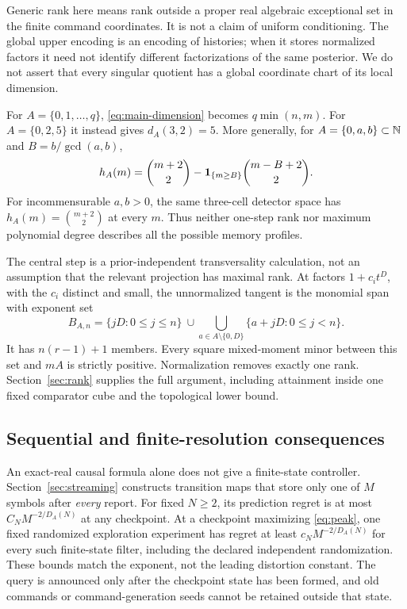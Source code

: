 Generic rank here means rank outside a proper real algebraic exceptional
set in the finite command coordinates. It is not a claim of uniform
conditioning. The global upper encoding is an encoding of histories;
when it stores normalized factors it need not identify different
factorizations of the same posterior. We do not assert that every singular
quotient has a global coordinate chart of its local dimension.

For $A=\{0,1,\ldots,q\}$, \eqref{eq:main-dimension} becomes
$q\min(n,m)$. For $A=\{0,2,5\}$ it instead gives $d_A(3,2)=5$.
More generally, for $A=\{0,a,b\}\subset\mathbb N$ and
$B=b/\gcd(a,b)$,
\begin{equation}\label{eq:three-intro}
 h_A(m)=\binom{m+2}{2}-\mathbf 1_{\{m\ge B\}}\binom{m-B+2}{2}.
\end{equation}
For incommensurable $a,b>0$, the same three-cell detector space has
$h_A(m)=\binom{m+2}{2}$ at every $m$. Thus neither one-step rank nor
maximum polynomial degree describes all the possible memory profiles.

The central step is a prior-independent transversality calculation, not
an assumption that the relevant projection has maximal rank. At factors
$1+c_i t^D$, with the $c_i$ distinct and small, the unnormalized tangent
is the monomial span with exponent set
\[
 B_{A,n}=\{jD:0\le j\le n\}
 \ \cup\!\!\bigcup_{a\in A\setminus\{0,D\}}
                  \{a+jD:0\le j<n\}.
\]
It has $n(r-1)+1$ members. Every square mixed-moment minor between this
set and $mA$ is strictly positive. Normalization removes exactly one rank.
Section~\ref{sec:rank} supplies the full argument, including attainment
inside one fixed comparator cube and the topological lower bound.

\subsection{Sequential and finite-resolution consequences}
An exact-real causal formula alone does not give a finite-state controller.
Section~\ref{sec:streaming} constructs transition maps that store only one
of $M$ symbols after \emph{every} report. For fixed $N\ge2$, its prediction
regret is at most $C_NM^{-2/D_A(N)}$ at any checkpoint. At a checkpoint
maximizing \eqref{eq:peak}, one fixed randomized exploration experiment
has regret at least $c_NM^{-2/D_A(N)}$ for every such finite-state filter,
including the declared independent randomization. These bounds match the
exponent, not the leading distortion constant. The query is announced
only after the checkpoint state has been formed, and old commands or
command-generation seeds cannot be retained outside that state.

